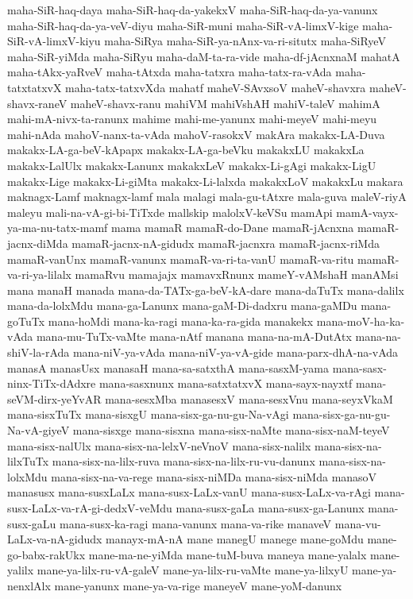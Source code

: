 {maha-SiR-haq-daya
maha-SiR-haq-da-yakekxV
maha-SiR-haq-da-ya-vanunx
maha-SiR-haq-da-ya-veV-diyu
maha-SiR-muni
maha-SiR-vA-limxV-kige
maha-SiR-vA-limxV-kiyu
maha-SiRya
maha-SiR-ya-nAnx-va-ri-situtx
maha-SiRyeV
maha-SiR-yiMda
maha-SiRyu
maha-daM-ta-ra-vide
maha-df-jAcnxnaM
mahatA
maha-tAkx-yaRveV
maha-tAtxda
maha-tatxra
maha-tatx-ra-vAda
maha-tatxtatxvX
maha-tatx-tatxvXda
mahatf
maheV-SAvxsoV
maheV-shavxra
maheV-shavx-raneV
maheV-shavx-ranu
mahiVM
mahiVshAH
mahiV-taleV
mahimA
mahi-mA-nivx-ta-ranunx
mahime
mahi-me-yanunx
mahi-meyeV
mahi-meyu
mahi-nAda
mahoV-nanx-ta-vAda
mahoV-rasokxV
makAra
makakx-LA-Duva
makakx-LA-ga-beV-kApapx
makakx-LA-ga-beVku
makakxLU
makakxLa
makakx-LalUlx
makakx-Lanunx
makakxLeV
makakx-Li-gAgi
makakx-LigU
makakx-Lige
makakx-Li-giMta
makakx-Li-lalxda
makakxLoV
makakxLu
makara
maknagx-Lamf
maknagx-lamf
mala
malagi
mala-gu-tAtxre
mala-guva
maleV-riyA
maleyu
mali-na-vA-gi-bi-TiTxde
mallskip
malolxV-keVSu
mamApi
mamA-vayx-ya-ma-nu-tatx-mamf
mama
mamaR
mamaR-do-Dane
mamaR-jAcnxna
mamaR-jacnx-diMda
mamaR-jacnx-nA-gidudx
mamaR-jacnxra
mamaR-jacnx-riMda
mamaR-vanUnx
mamaR-vanunx
mamaR-va-ri-ta-vanU
mamaR-va-ritu
mamaR-va-ri-ya-lilalx
mamaRvu
mamajajx
mamavxRnunx
mameY-vAMshaH
manAMsi
mana
manaH
manada
mana-da-TATx-ga-beV-kA-dare
mana-daTuTx
mana-dalilx
mana-da-lolxMdu
mana-ga-Lanunx
mana-gaM-Di-dadxru
mana-gaMDu
mana-goTuTx
mana-hoMdi
mana-ka-ragi
mana-ka-ra-gida
manakekx
mana-moV-ha-ka-vAda
mana-mu-TuTx-vaMte
mana-nAtf
manana
mana-na-mA-DutAtx
mana-na-shiV-la-rAda
mana-niV-ya-vAda
mana-niV-ya-vA-gide
mana-parx-dhA-na-vAda
manasA
manasUsx
manasaH
mana-sa-satxthA
mana-sasxM-yama
mana-sasx-ninx-TiTx-dAdxre
mana-sasxnunx
mana-satxtatxvX
mana-sayx-nayxtf
mana-seVM-dirx-yeYvAR
mana-sesxMba
manasesxV
mana-sesxVnu
mana-seyxVkaM
mana-sisxTuTx
mana-sisxgU
mana-sisx-ga-nu-gu-Na-vAgi
mana-sisx-ga-nu-gu-Na-vA-giyeV
mana-sisxge
mana-sisxna
mana-sisx-naMte
mana-sisx-naM-teyeV
mana-sisx-nalUlx
mana-sisx-na-lelxV-neVnoV
mana-sisx-nalilx
mana-sisx-na-lilxTuTx
mana-sisx-na-lilx-ruva
mana-sisx-na-lilx-ru-vu-danunx
mana-sisx-na-lolxMdu
mana-sisx-na-va-rege
mana-sisx-niMDa
mana-sisx-niMda
manasoV
manasusx
mana-susxLaLx
mana-susx-LaLx-vanU
mana-susx-LaLx-va-rAgi
mana-susx-LaLx-va-rA-gi-dedxV-veMdu
mana-susx-gaLa
mana-susx-ga-Lanunx
mana-susx-gaLu
mana-susx-ka-ragi
mana-vanunx
mana-va-rike
manaveV
mana-vu-LaLx-va-nA-gidudx
manayx-mA-nA‌
mane
manegU
manege
mane-goMdu
mane-go-babx-rakUkx
mane-ma-ne-yiMda
mane-tuM-buva
maneya
mane-yalalx
mane-yalilx
mane-ya-lilx-ru-vA-galeV
mane-ya-lilx-ru-vaMte
mane-ya-lilxyU
mane-ya-nenxlAlx
mane-yanunx
mane-ya-va-rige
maneyeV
mane-yoM-danunx
}

